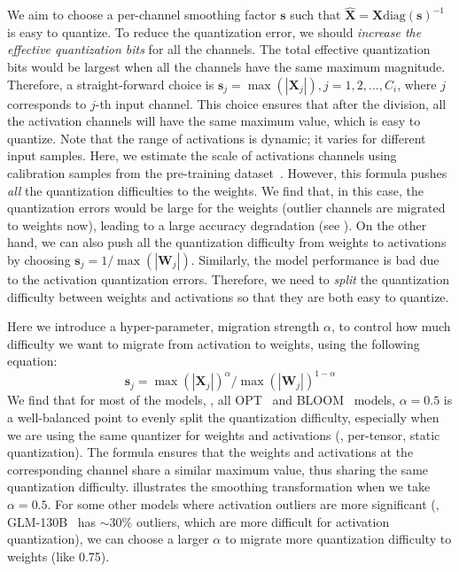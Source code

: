 We aim to choose a per-channel smoothing factor $\mathbf{s}$ such that $\hat{\mathbf{X}}=\mathbf{X}\text{diag}(\mathbf{s})^{-1}$ is easy to quantize.
To reduce the quantization error, we should \emph{increase the effective quantization bits}
for all the channels. The total effective quantization bits would be largest when all the channels have the same maximum magnitude. Therefore, a straight-forward choice is $\mathbf{s}_j = \max(|\mathbf{X}_j|), j=1,2,..., C_i$, where $j$ corresponds to $j$-th input channel. This choice ensures that after the division, all the activation channels will have the same maximum value, which is easy to quantize.
Note that the range of activations is dynamic; it varies for different input samples. Here, we estimate the scale of activations channels using calibration samples from the pre-training dataset~\cite{jacob2018quantization}.
However, this formula pushes \emph{all} the quantization difficulties to the weights. We find that, in this case, the quantization errors would be large for the weights (outlier channels are migrated to weights now), leading to a large accuracy degradation (see ).
On the other hand, we can also push all the quantization difficulty from weights to activations by choosing $\mathbf{s}_j = 1/\max(|\mathbf{W}_j|)$. Similarly, the model performance is bad due to the activation quantization errors.
Therefore, we need to \emph{split} the quantization difficulty between weights and activations so that they are both easy to quantize.


Here we introduce a hyper-parameter, migration strength $\alpha$, to control how much difficulty we want to migrate from activation to weights, using the following equation:
\begin{equation} \label{eq:s_sqrt}
    \mathbf{s}_j =  \max(|\mathbf{X}_j|)^{\alpha} / \max(|\mathbf{W}_j|) ^{1-\alpha}
\end{equation}
We find that for most of the models, \eg, all OPT~\cite{opt} and BLOOM~\cite{scao2022bloom} models, $\alpha=0.5$ is a well-balanced point to evenly split the quantization difficulty, especially when we are using the same quantizer for weights and activations (\eg, per-tensor, static quantization). The formula ensures that the weights and activations at the corresponding channel share a similar maximum value, thus sharing the same quantization difficulty.
 illustrates the smoothing transformation when we take $\alpha=0.5$.
For some other models where activation outliers are more significant (\eg, GLM-130B~\cite{zeng2022glm} has $\sim$30\% outliers, which are more difficult for activation quantization), we can choose a larger $\alpha$ to migrate more quantization difficulty to weights (like 0.75).


